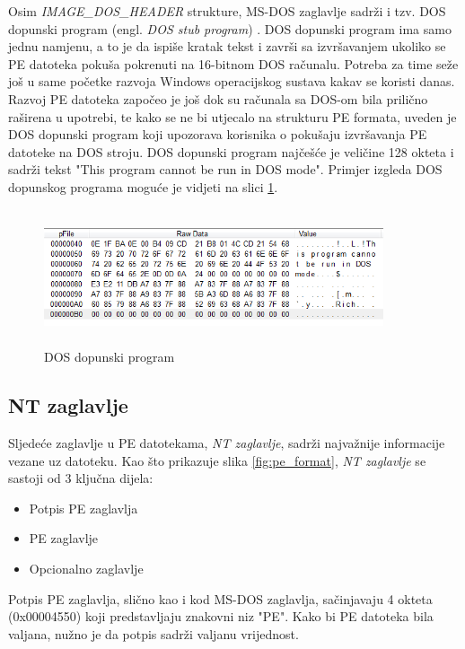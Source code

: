 \documentclass[times, utf8, diplomski, numeric]{fer}
\begin{document}
Osim \emph{IMAGE\_DOS\_HEADER} strukture, MS-DOS zaglavlje sadrži
i tzv. DOS dopunski program (engl. \emph{DOS stub
program}) \citep{dos_stub}. DOS dopunski program ima samo jednu
namjenu, a to je da ispiše kratak tekst i završi sa izvršavanjem
ukoliko se PE datoteka pokuša pokrenuti na 16-bitnom DOS računalu.
Potreba za time seže još u same početke razvoja Windows
operacijskog sustava kakav se koristi danas. Razvoj PE datoteka
započeo je još dok su računala sa DOS-om bila prilično raširena u
upotrebi, te kako se ne bi utjecalo na strukturu PE formata,
uveden je DOS dopunski program koji upozorava korisnika o
pokušaju izvršavanja PE datoteke na DOS stroju. DOS dopunski
program najčešće je veličine 128 okteta i sadrži tekst "This
program cannot be run in DOS mode". Primjer izgleda DOS dopunskog
programa moguće je vidjeti na slici \ref{fig:dos_stub}.

\begin{figure}[!ht]
\centering
\setlength\fboxsep{0pt}
\setlength\fboxrule{0.5pt}
\includegraphics[width=10cm, height=4cm]{slike/dos_stub}
\caption{DOS dopunski program}
\label{fig:dos_stub} 
\end{figure}

\subsection{NT zaglavlje}

Sljedeće zaglavlje u PE datotekama, \emph{NT zaglavlje}, sadrži
najvažnije informacije vezane uz datoteku. Kao što prikazuje
slika \ref{fig:pe_format}, \emph{NT zaglavlje} se sastoji od 3
ključna dijela:

\begin{itemize}
\item Potpis PE zaglavlja
\item PE zaglavlje
\item Opcionalno zaglavlje
\end{itemize} 

Potpis PE zaglavlja, slično kao i kod MS-DOS zaglavlja,
sačinjavaju 4 okteta (0x00004550) koji predstavljaju znakovni niz
"PE". Kako bi PE datoteka bila valjana, nužno je da potpis
sadrži valjanu vrijednost. 
\end{document}
